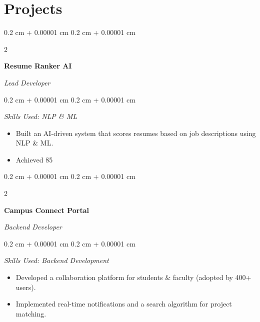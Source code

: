 \documentclass[10pt, letterpaper]{article}
\newenvironment{highlightsforbulletentries}{
        \begin{itemize}[
            topsep=0.10 cm,
            parsep=0.10 cm,
            partopsep=0pt,
            itemsep=0pt,
            leftmargin=10pt
        ]
    }{
        \end{itemize}
    }
\newenvironment{onecolentry}{
        \begin{adjustwidth}{
            0.2 cm + 0.00001 cm
        }{
            0.2 cm + 0.00001 cm
        }
    }{
        \end{adjustwidth}
    }
\newenvironment{twocolentry}[2][]{
        \onecolentry
        \def\secondColumn{#2}
        \setcolumnwidth{\fill, 4.5 cm}
        \begin{paracol}{2}
    }{
        \switchcolumn \raggedleft \secondColumn
        \end{paracol}
        \endonecolentry
    }
\begin{document}
        \section{Projects}
            \begin{twocolentry}{    
            \textit{Lead Developer}}
            \textbf{Resume Ranker AI}
            \end{twocolentry}
            \vspace{0.10 cm}
            \begin{onecolentry}
            \textit{Skills Used: NLP & ML}
                \begin{highlightsforbulletentries}
                            \item Built an AI-driven system that scores resumes based on job descriptions using NLP & ML.
                            \vspace{-2pt}
                            \item Achieved 85%
                            \vspace{-2pt}
                \end{highlightsforbulletentries}
            \end{onecolentry}

            \vspace{0.2 cm}
            \begin{twocolentry}{    
            \textit{Backend Developer}}
            \textbf{Campus Connect Portal}
            \end{twocolentry}
            \vspace{0.10 cm}
            \begin{onecolentry}
            \textit{Skills Used: Backend Development}
                \begin{highlightsforbulletentries}
                            \item Developed a collaboration platform for students & faculty (adopted by 400+ users).
                            \vspace{-2pt}
                            \item Implemented real-time notifications and a search algorithm for project matching.
                            \vspace{-2pt}
                \end{highlightsforbulletentries}
            \end{onecolentry}
\end{document}
